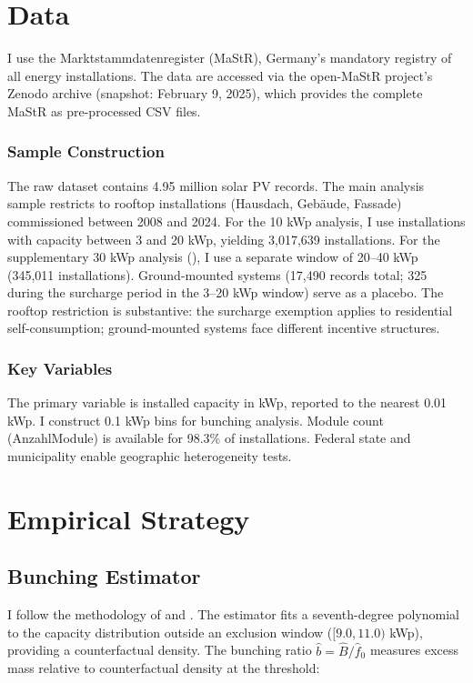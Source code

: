 \documentclass[12pt]{article}
\begin{document}
\section{Data}
\label{sec:data}

I use the Marktstammdatenregister (MaStR), Germany's mandatory registry of all energy installations. The data are accessed via the open-MaStR project's Zenodo archive (snapshot: February 9, 2025), which provides the complete MaStR as pre-processed CSV files.

\subsubsection*{Sample Construction} The raw dataset contains 4.95 million solar PV records. The main analysis sample restricts to rooftop installations (Hausdach, Geb\"{a}ude, Fassade) commissioned between 2008 and 2024. For the 10 kWp analysis, I use installations with capacity between 3 and 20 kWp, yielding 3,017,639 installations. For the supplementary 30 kWp analysis (), I use a separate window of 20--40 kWp (345,011 installations). Ground-mounted systems (17,490 records total; 325 during the surcharge period in the 3--20 kWp window) serve as a placebo. The rooftop restriction is substantive: the surcharge exemption applies to residential self-consumption; ground-mounted systems face different incentive structures.

\subsubsection*{Key Variables} The primary variable is installed capacity in kWp, reported to the nearest 0.01 kWp. I construct 0.1 kWp bins for bunching analysis. Module count (AnzahlModule) is available for 98.3\% of installations. Federal state and municipality enable geographic heterogeneity tests.




\section{Empirical Strategy}
\label{sec:strategy}

\subsection{Bunching Estimator}

I follow the methodology of \citet{saez2010taxpayers} and \citet{kleven2013using}. The estimator fits a seventh-degree polynomial to the capacity distribution outside an exclusion window ($[9.0, 11.0)$ kWp), providing a counterfactual density. The bunching ratio $\hat{b} = \hat{B}/\hat{f}_0$ measures excess mass relative to counterfactual density at the threshold:
\end{document}
